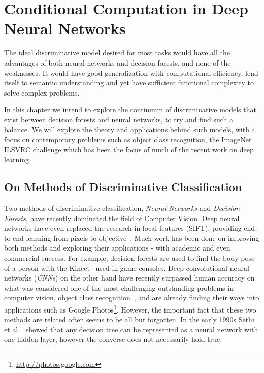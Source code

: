 \documentclass[thesis]{subfiles}
\begin{document}
	\chapter{Conditional Computation in Deep Neural Networks}
	\label{conditionalnetworks}
	
	The ideal discriminative model desired for most tasks would have all the advantages of both neural networks and decision forests, and none of the weaknesses. It would have good generalization with computational efficiency, lend itself to semantic understanding and yet have sufficient functional complexity to solve complex problems. 
	
	In this chapter we intend to explore the continuum of discriminative models that exist between decision forests and neural networks, to try and find such a balance. We will explore the theory and applications behind such models, with a focus on contemporary problems such as object class recognition, \ie the ImageNet ILSVRC challenge which has been the focus of much of the recent work on deep learning.
	
	\section{On Methods of Discriminative Classification}
	
	Two methods of discriminative classification, \emph{Neural Networks} and \emph{Decision Forests}, have recently dominated the field of Computer Vision. Deep neural networks have even replaced the research in local features (\eg SIFT), providing end-to-end learning from pixels to objective~\citep{yi2016lift}. Much work has been done on improving both methods and exploring their applications - with academic and even commercial success. For example, decision forests are used to find the body pose of a person with the Kinect~\citep{conf/cvpr/ShottonFCSFMKB11} used in game consoles. Deep convolutional neural networks (\emph{CNNs}) on the other hand have recently surpassed human accuracy on what was considered one of the most challenging outstanding problems in computer vision, object class recognition~\citep{He2015b}, and are already finding their ways into applications such as Google Photos\footnote{\href{http://photos.google.com}{http://photos.google.com}}. However, the important fact that these two methods are related often seems to be all but forgotten. In the early 1990s Sethi et al.~\citep{Sethi1990} showed that any decision tree can be represented as a neural network with one hidden layer, however the converse does not necessarily hold true.
	
\end{document}

